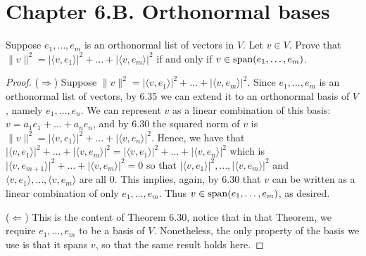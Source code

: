 \section*{Chapter 6.B. Orthonormal bases}


\begin{exercise}{2}
  Suppose $e_1,\dots,e_m$ is an orthonormal list of vectors in $V$. Let $v\in V$. Prove that $\lVert v\rVert^2 =\lvert\langle v,e_1\rangle\rvert^2+\dots+\lvert\langle v,e_m\rangle\rvert^2$ if and only if $v\in\operatorname*{span}(e_1,\dots,e_m)$.
\end{exercise}
\begin{proof}
 ($\Rightarrow$) Suppose $\lVert v\rVert^2 =\lvert\langle v,e_1\rangle\rvert^2+\dots+\lvert\langle v,e_m\rangle\rvert^2$. Since $e_1,\dots,e_m$ is an orthonormal list of vectors, by 6.35 we can extend it to an orthonormal basis of $V$, namely $e_1,\dots,e_n$. We can represent $v$ as a linear combination of this basis: $v=a_1e_1+\dots+a_ne_n$, and by 6.30 the squared norm of $v$ is $\lVert v\rVert^2 =\lvert\langle v,e_1\rangle\rvert^2+\dots+\lvert\langle v,e_n\rangle\rvert^2$. Hence, we have that $\lvert\langle v,e_1\rangle\rvert^2+\dots+\lvert\langle v,e_m\rangle\rvert^2 =\lvert\langle v,e_1\rangle\rvert^2+\dots+\lvert\langle v,e_n\rangle\rvert^2$ which is $\lvert\langle v,e_{m+1}\rangle\rvert^2+\dots+\lvert\langle v,e_m\rangle\rvert^2 =0$ so that $\lvert\langle v,e_1\rangle\rvert^2,\dots,\lvert\langle v,e_m\rangle\rvert^2$ and $\langle v,e_1\rangle,\dots,\langle v,e_m\rangle$ are all 0. This implies, again, by 6.30 that $v$ can be written as a linear combination of only $e_1,\dots,e_m$. Thus $v\in\operatorname*{span}(e_1,\dots,e_m)$, as desired.

 ($\Leftarrow$) This is the content of Theorem 6.30, notice that in that Theorem, we require $e_1,\dots,e_m$ to be a basis of $V$. Nonetheless, the only property of the basis we use is that it spans $v$, so that the same result holds here.
\end{proof}

